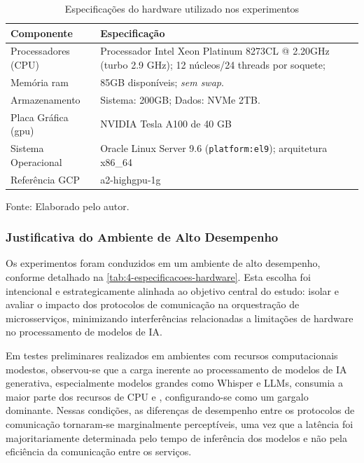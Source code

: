 \begin{table}[H]
\centering
\caption{Especificações do hardware utilizado nos experimentos}
\label{tab:4-especificacoes-hardware}
\begin{tabularx}{\linewidth}{|l|X|}
\hline
\textbf{Componente} & \textbf{Especificação} \\
\hline
Processadores (CPU) & Processador Intel Xeon Platinum 8273CL @ 2.20GHz (turbo 2.9 GHz); 12 núcleos/24 threads por soquete; \\
\hline
Memória \acrshort{ram} & 85GB disponíveis; \textit{sem swap}. \\
\hline
Armazenamento & Sistema: 200GB; Dados: NVMe 2TB. \\
\hline
Placa Gráfica (\acrshort{gpu}) & NVIDIA Tesla A100 de 40 GB \\
\hline
Sistema Operacional & Oracle Linux Server 9.6 (\texttt{platform:el9}); arquitetura x86\_64 \\
\hline
Referência GCP & a2-highgpu-1g \\
\hline
\end{tabularx}
{\par \raggedright \footnotesize Fonte: Elaborado pelo autor.\par}
\end{table}

\subsubsection{Justificativa do Ambiente de Alto Desempenho}
\label{subsec:justificativa-hardware}

Os experimentos foram conduzidos em um ambiente de alto desempenho, conforme detalhado na \autoref{tab:4-especificacoes-hardware}. Esta escolha foi intencional e estrategicamente alinhada ao objetivo central do estudo: isolar e avaliar o impacto dos protocolos de comunicação na orquestração de microsserviços, minimizando interferências relacionadas a limitações de hardware no processamento de modelos de IA.

Em testes preliminares realizados em ambientes com recursos computacionais modestos, observou-se que a carga inerente ao processamento de modelos de IA generativa, especialmente modelos grandes como Whisper e LLMs, consumia a maior parte dos recursos de CPU e , configurando-se como um gargalo dominante. Nessas condições, as diferenças de desempenho entre os protocolos de comunicação tornaram-se marginalmente perceptíveis, uma vez que a latência foi majoritariamente determinada pelo tempo de inferência dos modelos e não pela eficiência da comunicação entre os serviços.

